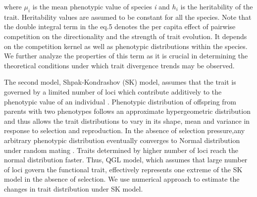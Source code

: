 \documentclass[12pt]{article}
\begin{document}
where $\mu_i$ is the mean phenotypic value of species \emph{i} and $h_{i}$ is the heritability of the trait. Heritability values are assumed to be constant for all the species. Note that the double integral term in the eq.5 denotes the per capita effect of pairwise competition on the directionality and the strength of trait evolution. It depends on the competition kernel as well as phenotypic distributions within the species. We further analyze the properties of this term as it is crucial in determining the theoretical conditions under which trait divergence trends may be observed.  

The second model, Shpak-Kondrashov (SK) model, assumes that the trait is governed by a limited number of loci which contribute additively to the phenotypic value of an individual \cite{Shpak1999}. Phenotypic distribution of offspring from parents with two phenotypes follows an approximate hypergeometric distribution and thus allows the trait distributions to vary in its shape, mean and variance in response to selection and reproduction. In the absence of selection pressure,any arbitrary phenotypic distribution eventually converges to Normal distribution under random mating \cite{Shpak1999,yamauchi2009intraspecific}. Traits determined by higher number of loci reach the normal distribution faster. Thus, QGL model, which assumes that large number of loci govern the functional trait, effectively represents one extreme of the SK model in the absence of selection. We use numerical approach to estimate the changes in trait distribution under SK model.
 
\end{document}
